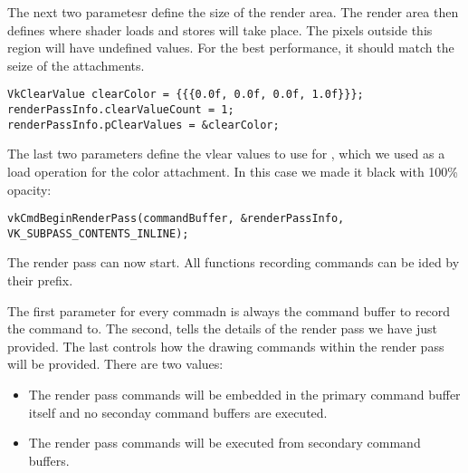 \par The next two parametesr define the size of the render area. The render area then defines where shader loads and stores will take place. The pixels outside this region will have undefined values. For the best performance, it should match the seize of the attachments.

\begin{center}
\begin{minipage}{0.95\linewidth}
\begin{lstlisting}
VkClearValue clearColor = {{{0.0f, 0.0f, 0.0f, 1.0f}}};
renderPassInfo.clearValueCount = 1;
renderPassInfo.pClearValues = &clearColor;
\end{lstlisting}
\end{minipage}
\end{center}

\par The last two parameters define the vlear values to use for , which we used as a load operation for the color attachment. In this case we made it black with 100\% opacity:

\begin{center}
\begin{minipage}{0.95\linewidth}
\begin{lstlisting}
vkCmdBeginRenderPass(commandBuffer, &renderPassInfo, VK_SUBPASS_CONTENTS_INLINE);
\end{lstlisting}
\end{minipage}
\end{center}

\par The render pass can now start. All functions recording commands can be ided by their  prefix.

\par The first parameter for every commadn is always the command buffer to record the command to. The second, tells the details of the render pass we have just provided. The last controls how the drawing commands within the render pass will be provided. There are two values:

\begin{itemize}
    \item {} The render pass commands will be embedded in the primary command buffer itself and no seconday command buffers are executed.
    \item {} The render pass commands will be executed from secondary command buffers.
\end{itemize}

